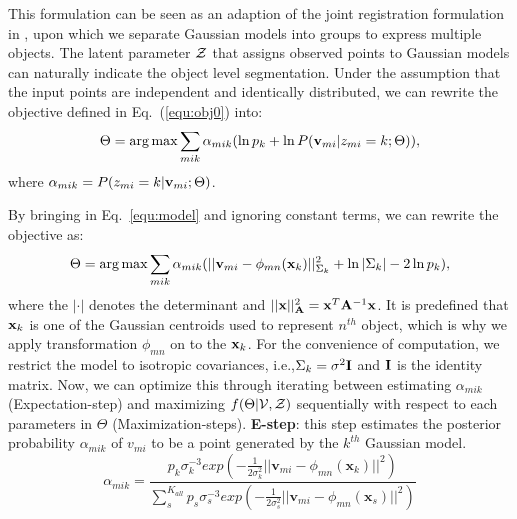 This formulation can be seen as an adaption of the joint registration formulation in \cite{Evangelidis2014}, upon which we separate Gaussian models into groups to express multiple objects. 
%
The latent parameter $\mathcal{Z}$ that assigns observed points to Gaussian models can naturally indicate the object level segmentation.
%
Under the assumption that the input points are independent and identically distributed, we can rewrite the objective defined in Eq.~(\ref{equ:obj0}) into:
%
\begin{equation} \label{equ:obj2}
\Theta=\arg\max\sum_{mik}\alpha_{mik}(\ln p_k + \ln P(\mathbf{v}_{mi}|z_{mi}=k;\Theta)),
\end{equation}
%
where $\alpha_{mik} = P( z_{mi} = k | \mathbf{v}_{mi} ; \Theta )$.


By bringing in Eq.~\ref{equ:model} and ignoring constant terms, we can rewrite the objective as:
\begin{equation}
\label{equ:obj3}
\Theta=\arg\max\sum_{mik}\alpha_{mik}(||\mathbf{v}_{mi}-\phi_{mn}(\mathbf{x}_k)||_{\Sigma_k}^2 + \ln |\Sigma_k| - 2\ln p_k), 
\end{equation}
%
where the $|\cdot|$ denotes the determinant and $||\mathbf{x}||_{\mathbf{A}}^2=\mathbf{x}^T\mathbf{A}^{-1}\mathbf{x}$. 
%
It is predefined that $\mathbf{x}_k$ is one of the Gaussian centroids used to represent $n^{th}$ object, which is why we apply transformation $\phi_{mn}$ on to the $\mathbf{x}_k$. 
%
For the convenience of computation, we restrict the model to isotropic covariances, i.e.,$\Sigma_k=\sigma^2\mathbf{I}$ and $\mathbf{I}$ is the identity matrix.
%
Now, we can optimize this through iterating between estimating $\alpha_{mik}$ (Expectation-step) and maximizing $f(\Theta|\mathcal{V},\mathcal{Z})$ sequentially with respect to each parameters in $\Theta$ (Maximization-steps).
%
\textbf{E-step}:
this step estimates the posterior probability $\alpha_{mik}$ of $v_{mi}$ to be a point generated by the $k^{th}$ Gaussian model.
%
\begin{equation}
\label{equ:estep}
\alpha_{mik}=\frac{p_k\sigma_k^{-3}exp(-\frac{1}{2\sigma_k^2}||\pmb v_{mi}-\phi_{mn}(\pmb x_k)||^2)}{\sum_s^{K_{all}}p_s\sigma_s^{-3}exp(-\frac{1}{2\sigma_s^2}||\pmb v_{mi}-\phi_{mn}(\pmb x_s)||^2)}
\end{equation}
%


